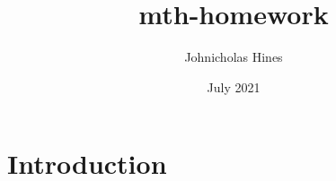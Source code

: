 \documentclass{article}
\title{mth-homework}
\author{Johnicholas Hines}
\date{July 2021}
\begin{document}
\maketitle

\section{Introduction}
\end{document}
